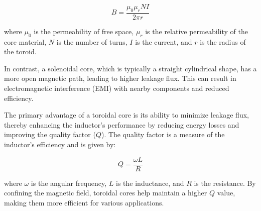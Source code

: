\[
B = \frac{\mu_0 \mu_r N I}{2 \pi r}
\]

where $\mu_0$ is the permeability of free space, $\mu_r$ is the relative permeability of the core material, $N$ is the number of turns, $I$ is the current, and $r$ is the radius of the toroid.

In contrast, a solenoidal core, which is typically a straight cylindrical shape, has a more open magnetic path, leading to higher leakage flux. This can result in electromagnetic interference (EMI) with nearby components and reduced efficiency.

The primary advantage of a toroidal core is its ability to minimize leakage flux, thereby enhancing the inductor's performance by reducing energy losses and improving the quality factor ($Q$). The quality factor is a measure of the inductor's efficiency and is given by:

\[
Q = \frac{\omega L}{R}
\]

where $\omega$ is the angular frequency, $L$ is the inductance, and $R$ is the resistance. By confining the magnetic field, toroidal cores help maintain a higher $Q$ value, making them more efficient for various applications.

